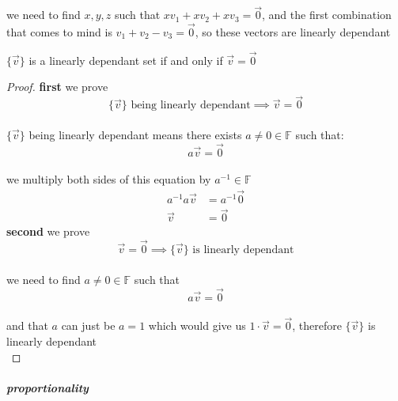 \documentclass[a4paper,12pt]{article}
\begin{document}
\begin{definition}
\begin{my_example}
we need to find \(x,y,z\) such that \(xv_1 + xv_2 + xv_3 = \vec0\), and the first combination that comes to mind is \(v_1 + v_2 - v_3 = \vec0\), so these vectors are linearly dependant\\
\end{my_example}
\begin{lemma}
\(\{\vec v\}\) is a linearly dependant set if and only if \(\vec v = \vec0\)\\
\begin{proof}
\textbf{first} we prove\\
\[ \{\vec v\} \text{ being linearly dependant} \implies \vec v = \vec0 \]\\
\(\{\vec v\}\) being linearly dependant means there exists \(a \neq 0 \in \mathbb{F}\) such that:\\
\[ a\vec v = \vec0 \]\\
we multiply both sides of this equation by \(a^{-1} \in \mathbb{F}\)\\
\begin{align*}
  a^{-1}a\vec v &= a^{-1}\vec0\\
  \vec v &= \vec0
\end{align*} 
\textbf{second} we prove\\
\[ \vec v = \vec0 \implies \{\vec v\} \text{ is linearly dependant} \]\\
we need to find \(a \neq 0 \in \mathbb{F}\) such that\\
\[
  a\vec v = \vec0
\]\\
and that \(a\) can just be \(a = 1\) which would give us \(1 \cdot \vec v = \vec0\), therefore \(\{\vec v\}\) is linearly dependant\\
\end{proof}
\end{lemma}
\end{definition}
\subparagraph{proportionality}
\label{sec:org381ea32}
\end{document}
